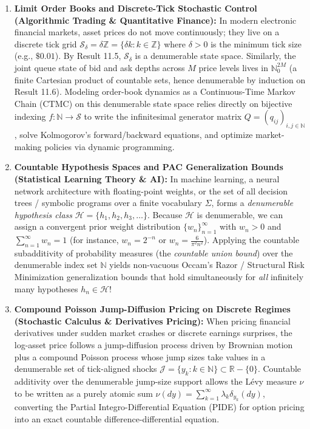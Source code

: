 \documentclass[11pt, letterpaper]{article}
\theoremstyle{definition}
\theoremstyle{remark}
\begin{document}
\begin{enumerate}[label=\textbf{\arabic*.}]
    \item \textbf{Limit Order Books and Discrete-Tick Stochastic Control (Algorithmic Trading \& Quantitative Finance):}
    In modern electronic financial markets, asset prices do not move continuously; they live on a discrete tick grid $\mathcal{S}_{\delta} = \delta \mathbb{Z} = \{\delta k : k \in \mathbb{Z}\}$ where $\delta > 0$ is the minimum tick size (e.g., $\$0.01$). By Result 11.5, $\mathcal{S}_{\delta}$ is a denumerable state space. Similarly, the joint queue state of bid and ask depths across $M$ price levels lives in $\mathbb{N}_0^{2M}$ (a finite Cartesian product of countable sets, hence denumerable by induction on Result 11.6). Modeling order-book dynamics as a Continuous-Time Markov Chain (CTMC) on this denumerable state space relies directly on bijective indexing $f : \mathbb{N} \to \mathcal{S}$ to write the infinitesimal generator matrix $Q = (q_{ij})_{i,j \in \mathbb{N}}$, solve Kolmogorov's forward/backward equations, and optimize market-making policies via dynamic programming.

    \item \textbf{Countable Hypothesis Spaces and PAC Generalization Bounds (Statistical Learning Theory \& AI):}
    In machine learning, a neural network architecture with floating-point weights, or the set of all decision trees / symbolic programs over a finite vocabulary $\Sigma$, forms a \emph{denumerable hypothesis class} $\mathcal{H} = \{h_1, h_2, h_3, \dots\}$. Because $\mathcal{H}$ is denumerable, we can assign a convergent prior weight distribution $\{w_n\}_{n=1}^{\infty}$ with $w_n > 0$ and $\sum_{n=1}^{\infty} w_n = 1$ (for instance, $w_n = 2^{-n}$ or $w_n = \frac{6}{\pi^2 n^2}$). Applying the countable subadditivity of probability measures (the \emph{countable union bound}) over the denumerable index set $\mathbb{N}$ yields non-vacuous Occam's Razor / Structural Risk Minimization generalization bounds that hold simultaneously for \emph{all} infinitely many hypotheses $h_n \in \mathcal{H}$!

    \item \textbf{Compound Poisson Jump-Diffusion Pricing on Discrete Regimes (Stochastic Calculus \& Derivatives Pricing):}
    When pricing financial derivatives under sudden market crashes or discrete earnings surprises, the log-asset price follows a jump-diffusion process driven by Brownian motion plus a compound Poisson process whose jump sizes take values in a denumerable set of tick-aligned shocks $\mathcal{J} = \{y_k : k \in \mathbb{N}\} \subset \mathbb{R} - \{0\}$. Countable additivity over the denumerable jump-size support allows the L\'evy measure $\nu$ to be written as a purely atomic sum $\nu(dy) = \sum_{k=1}^{\infty} \lambda_k \delta_{y_k}(dy)$, converting the Partial Integro-Differential Equation (PIDE) for option pricing into an exact countable difference-differential equation.
\end{enumerate}
\end{document}
